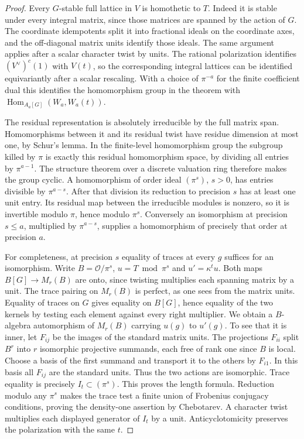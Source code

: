 \documentclass[a4paper,11pt]{article}
\theoremstyle{definition}
\theoremstyle{remark}
\numberwithin{equation}{section}
\begin{document}
\begin{proof}
Every \(G\)-stable full lattice in \(V\) is homothetic to \(T\).
Indeed it is stable under every integral matrix, since those matrices
are spanned by the action of \(G\). The coordinate idempotents split
it into fractional ideals on the coordinate axes, and the off-diagonal
matrix units identify those ideals. The same argument applies after a
scalar character twist by units. The rational polarization identifies
\((V^\vee)^c(1)\) with \(V(t)\), so the corresponding integral lattices
can be identified equivariantly after a scalar rescaling. With a choice
of \(\pi^{-a}\) for the finite coefficient dual this identifies the
homomorphism group in the theorem with
\(\operatorname{Hom}_{A_a[G]}(W_a,W_a(t))\).

The residual representation is absolutely irreducible by the full matrix
span. Homomorphisms between it and its residual twist have residue
dimension at most one, by Schur's lemma. In the finite-level
homomorphism group the subgroup killed by \(\pi\) is exactly this
residual homomorphism space, by dividing all entries by \(\pi^{a-1}\).
The structure theorem over a discrete valuation ring therefore makes
the group cyclic. A homomorphism of order ideal \((\pi^s)\), \(s>0\),
has entries divisible by \(\pi^{a-s}\). After that division its
reduction to precision \(s\) has at least one unit entry. Its residual
map between the irreducible modules is nonzero, so it is invertible
modulo \(\pi\), hence modulo \(\pi^s\). Conversely an isomorphism at
precision \(s\le a\), multiplied by \(\pi^{a-s}\), supplies a
homomorphism of precisely that order at precision \(a\).

For completeness, at precision \(s\) equality of traces at every
\(g\) suffices for an isomorphism. Write \(B=\mathcal O/\pi^s\),
\(u=T\bmod\pi^s\) and \(u'=\kappa^t u\). Both maps \(B[G]\to M_r(B)\)
are onto, since twisting multiplies each spanning matrix by a unit.
The trace pairing on \(M_r(B)\) is perfect, as one sees from the matrix
units. Equality of traces on \(G\) gives equality on \(B[G]\), hence
equality of the two kernels by testing each element against every
right multiplier. We obtain a \(B\)-algebra automorphism of \(M_r(B)\)
carrying \(u(g)\) to \(u'(g)\). To see that it is inner, let \(F_{ij}\)
be the images of the standard matrix units. The projections \(F_{ii}\)
split \(B^r\) into \(r\) isomorphic projective summands, each free of
rank one since \(B\) is local. Choose a basis of the first summand and
transport it to the others by \(F_{i1}\). In this basis all \(F_{ij}\)
are the standard units. Thus the two actions are isomorphic.
Trace equality is precisely \(I_t\subset(\pi^s)\). This proves the
length formula. Reduction modulo any \(\pi^s\) makes the trace test
a finite union of Frobenius conjugacy conditions, proving the
density-one assertion by Chebotarev. A character twist multiplies
each displayed generator of \(I_t\) by a unit. Anticyclotomicity
preserves the polarization with the same \(t\).
\end{proof}
\end{document}
